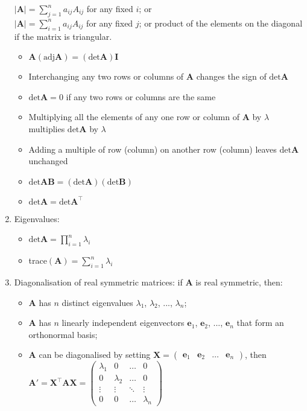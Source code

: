 \documentclass[fleqn]{article}
\begin{document}
\begin{enumerate}
        $|\mathbf{A}|=\displaystyle\sum_{j=1}^n a_{ij}A_{ij}$ for any fixed $i$; or\\
        $|\mathbf{A}|=\displaystyle\sum_{i=1}^n a_{ij}A_{ij}$ for any fixed $j$; or\smallbreak
        product of the elements on the diagonal if the matrix is triangular.
        \begin{itemize}[topsep=0pt]
            \item $\mathbf{A}(\text{adj}\mathbf{A})=(\text{det}\mathbf{A})\mathbf{I}$
            \item Interchanging any two rows or columns of $\mathbf{A}$ changes the sign of $\text{det}\mathbf{A}$
            \item $\text{det}\mathbf{A}=0$ if any two rows or columns are the same
            \item Multiplying all the elements of any one row or column of $\mathbf{A}$ by $\lambda$ multiplies $\text{det}\mathbf{A}$ by $\lambda$
            \item Adding a multiple of row (column) on another row (column) leaves $\text{det}\mathbf{A}$ unchanged
            \item $\text{det}\mathbf{AB}=(\text{det}\mathbf{A})(\text{det}\mathbf{B})$
            \item $\text{det}\mathbf{A}=\text{det}\mathbf{A}^\top$
        \end{itemize}
    \item Eigenvalues:
        \begin{itemize}[topsep=0pt]
            \item $\text{det}\mathbf{A}=\displaystyle\prod_{i=1}^n \lambda_i$
            \item trace$(\mathbf{A})=\displaystyle\sum_{i=1}^n \lambda_i$
        \end{itemize}
    \item Diagonalisation of real symmetric matrices: if $\mathbf{A}$ is real symmetric, then:
        \begin{itemize}[topsep=0pt]
            \item $\mathbf{A}$ has $n$ distinct eigenvalues $\lambda_1$, $\lambda_2$, ..., $\lambda_n$;
            \item $\mathbf{A}$ has $n$ linearly independent eigenvectors $\mathbf{e}_1$, $\mathbf{e}_2$, ..., $\mathbf{e}_n$ that form an orthonormal basis;
            \item $\mathbf{A}$ can be diagonalised by setting $\mathbf{X}=\begin{pmatrix}
                    \mathbf{e}_1 & \mathbf{e}_2 & \dots & \mathbf{e}_n
                \end{pmatrix}$, then \smallbreak
                $\mathbf{A}'=\mathbf{X}^\top\mathbf{AX}=
                \begin{pmatrix}
                    \lambda_1 & 0 & \dots & 0\\
                    0 & \lambda_2 & \dots & 0\\
                    \vdots & \vdots & \ddots & \vdots\\
                    0 & 0 & \dots & \lambda_n 
                \end{pmatrix}$
        \end{itemize}
\end{enumerate}
\end{document}
